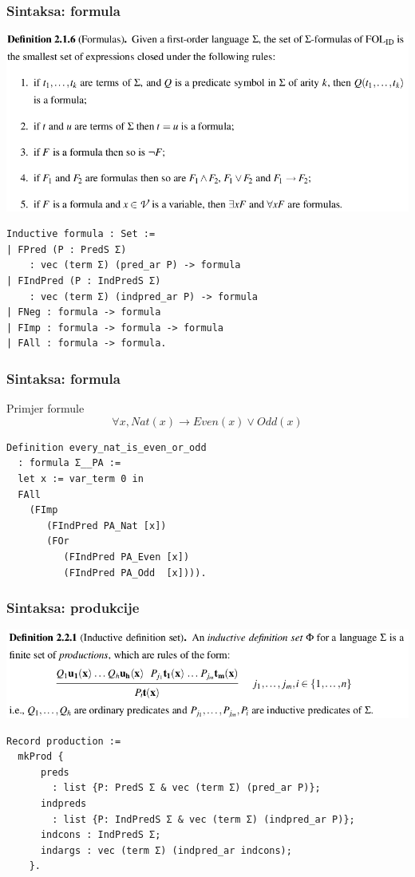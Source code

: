 \documentclass{beamer}
\begin{document}
\begin{frame}[fragile]
  \frametitle{Sintaksa: formula}
  \begin{center}
    \includegraphics[width=0.6\linewidth]{formula}
  \end{center}
\begin{verbatim}
Inductive formula : Set :=
| FPred (P : PredS Σ)
    : vec (term Σ) (pred_ar P) -> formula 
| FIndPred (P : IndPredS Σ)
    : vec (term Σ) (indpred_ar P) -> formula 
| FNeg : formula -> formula 
| FImp : formula -> formula -> formula 
| FAll : formula -> formula.
\end{verbatim}
\end{frame}

\begin{frame}[fragile]
  \frametitle{Sintaksa: formula}
  \begin{block}{Primjer formule}
    \[
      \forall x, \mathit{Nat}(x) \rightarrow \mathit{Even}(x) \lor \mathit{Odd}(x)
    \]
  \end{block}
\begin{verbatim}
Definition every_nat_is_even_or_odd
  : formula Σ__PA :=
  let x := var_term 0 in
  FAll
    (FImp
       (FIndPred PA_Nat [x])
       (FOr
          (FIndPred PA_Even [x])
          (FIndPred PA_Odd  [x]))).
\end{verbatim}
\end{frame}

\begin{frame}[fragile]
  \frametitle{Sintaksa: produkcije}
  \begin{center}
    \includegraphics[width=0.6\linewidth]{production}
  \end{center}
  \begin{huge}
    \begin{prooftree}
    \end{prooftree}
  \end{huge}
  \begin{footnotesize}
\begin{verbatim}
Record production :=
  mkProd {
      preds
        : list {P: PredS Σ & vec (term Σ) (pred_ar P)};
      indpreds
        : list {P: IndPredS Σ & vec (term Σ) (indpred_ar P)};
      indcons : IndPredS Σ;
      indargs : vec (term Σ) (indpred_ar indcons);
    }.
\end{verbatim}
  \end{footnotesize}
\end{frame}
\end{document}
